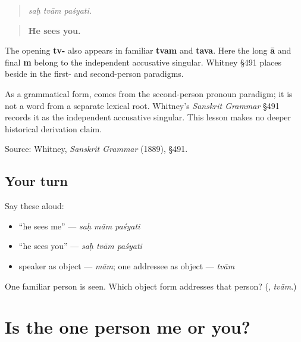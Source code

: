 \begin{quote}
\textbf{  }
\end{quote}

\begin{quote}
\emph{saḥ tvām paśyati.}
\end{quote}

\begin{quote}
\textbf{He sees you.}
\end{quote}

The opening \textbf{tv-} also appears in familiar \textbf{tvam} and \textbf{tava}. Here the long \textbf{ā} and final \textbf{m} belong to the independent accusative singular. Whitney §491 places \textbf{} beside \textbf{} in the first- and second-person paradigms.

\begin{cousinweb}
As a grammatical form, \textbf{} comes from the second-person pronoun paradigm; it is not a word from a separate lexical root. Whitney's \emph{Sanskrit Grammar} §491 records it as the independent accusative singular. This lesson makes no deeper historical derivation claim.

Source: Whitney, \emph{Sanskrit Grammar} (1889), §491.
\end{cousinweb}

\subsection*{Your turn}
Say these aloud:

\begin{itemize}
\raggedright
  \item “he sees me” — \emph{saḥ mām paśyati}
  \item “he sees you” — \emph{saḥ tvām paśyati}
  \item speaker as object — \emph{mām}; one addressee as object — \emph{tvām}
\end{itemize}

\begin{tcolorbox}[breakable,colback=teal!4,colframe=teal!35!black,title={Before you move on}]
One familiar person is seen. Which object form addresses that person? (\textbf{}, \emph{tvām}.)
\end{tcolorbox}
\section[Practice]{Is the one person me or you?}

